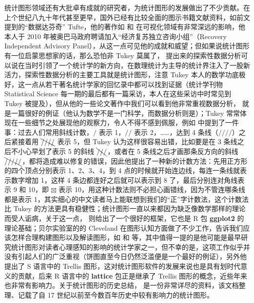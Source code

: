 \documentclass[
  b5paper,
  UTF8,twoside]{book}
\begin{document}
统计图形领域还有大批卓有成就的研究者，为统计图形的发展做出了不少贡献。在上个世纪八九十年代甚至更早，国外已经有比较全面的图示书籍文献资料，如前文提到的``数据达芬奇'' Tufte，他的著作如 \citet{Tufte92} 和 \citet{Tufte01} 在可视化领域有非常深远的影响，他本人于 2010 年被奥巴马政府聘请加入``经济复苏独立咨询小组''（Recovery Independent Advisory Panel），从这一点可见他的成就和威望；但如果说统计图形有一位启蒙思想家的话，那么恐怕非 Tukey 莫属了，\citet{Tukey1977} 提出来的探索性数据分析可以说在当时引领了一个统计学的新方向，在数理统计为主导的统计界注入了一股新活力，探索性数据分析的主要工具就是统计图形，注意 Tukey 本人的数学功底极好，这一点从若干著名统计学家的回忆录中都可以找到证据（统计学刊物 Statistical Science 每一期的最后都有一篇采访，本人在这些采访中时常见到 Tukey 被提及），但从他的一些论文著作中我们可以看到他非常重视数据分析，\citet{Tukey62} 就是一篇很好的例证（他认为数学不是一门科学，而数据分析则是）；Tukey 常常体现在一些细节之处展现他的观察力，令人不得不感到佩服，例如 \citet{Wainer81} 中提到了一件事：过去人们常用斜线计数，\(\text{/}\) 表示 1，\(\text{//}\) 表示 2，\ldots\ldots，达到 4 条线（\(\text{////}\)）之后紧接着用 \(\bcancel{\text{////}}\) 表示 5，但 Tukey 认为这样很容易出错，比如要是在 3 条线之后不小心早划了表示 5 的斜线 \(\bcancel{\text{///}}\)，或者在 5 条线之后才画那条反方向的斜线 \(\bcancel{\text{/////}}\)，都将造成难以修复的错误，因此他提出了一种新的计数方法：先用正方形的四个顶点分别表示 1、2、3、4，到 4 点的时候就开始连边线，每连一条线就表示数字增加 1，这样 4 条边都连好之后就可以表示到 8 了，最后分别连对角线表示 9 和 10，即 \(\boxtimes\) 表示 10，用这种计数法则不必担心画错线，因为不管连哪条线都是表示 1，其实细心的中文读者马上能联想到我们的``正''字计数法，这个计数法比 Tukey 的方法更具有稳健性；统计图形一直以来都因为缺乏像数学那样的理论而受人诟病，关于这一点，\citet{Wilkinson05} 则给出了一个很好的框架，它也是 R 包 \textbf{ggplot2} 的理论基础；贝尔实验室的的 Cleveland 在图形认知方面做了不少工作，告诉我们应该怎样合理构建图形以及解读图形，如 \citet{Cleveland85} 和 \citet{Cleveland93} 等，其中值得一提的是他可能是最早研究统计图形对读者心理感知的影响的统计学家之一，但不幸的是，这项工作似乎并没有引起人们的广泛重视（饼图直至今日仍然泛滥便是一个最好的例证），另外他提出了 S 语言中的 Trellis 图形，这对统计图形软件的发展来说也是具有划时代意义的贡献，后来 R 语言中的 \textbf{lattice} 包正是继承了 Trellis 图形的概念，近些年来也非常有影响力。关于统计图形的历史总结，\citet{Friendly01} 是一份非常详尽的资料，该文档整理、记载了自 17 世纪以前至今数百年历史中较有影响力的统计图形。
\end{document}
